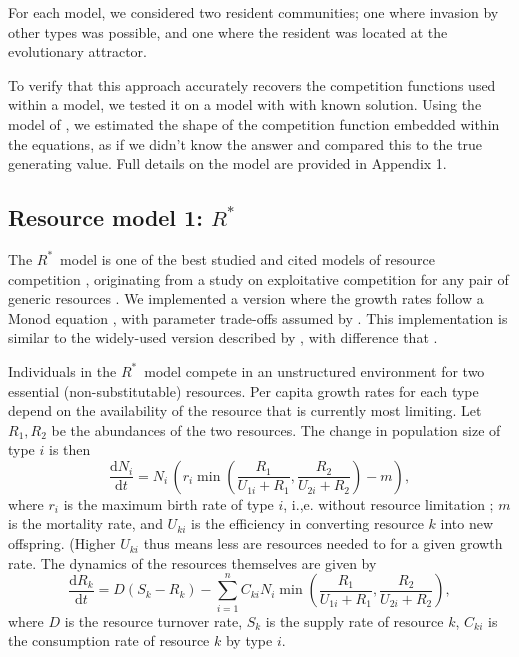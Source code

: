 \documentclass[a4paper,11pt]{article}
\newcommand{\verify}[1]{{\color{navy}{(verify: #1)}}}
\newcommand{\todo}[1]{{\color{navy}{(todo: #1)}}}
\newcommand{\ud}{\ensuremath{\mathrm{d}}}
\newcommand{\Rstar}{\ensuremath{R^*}}
\begin{document}
For each model, we considered two resident communities; one where invasion by other types was possible, and one where the resident was located at the evolutionary attractor.

To verify that this approach accurately recovers the competition functions used within a model, we tested it on a model with with known solution. Using the model of \citet{Dieckmann-1999}, we estimated the shape of the competition function embedded within the equations, as if we didn't know the answer and compared this to the true generating value. Full details on the model are provided in Appendix 1.

\subsection{Resource model 1: \Rstar }

The \Rstar\ model is one of the best studied and cited models of resource competition \citep{Tilman-1977, Tilman-1982, Huisman-2001}, originating from a study on exploitative competition for any pair of generic resources \citep{Leon-1975}. We implemented a version where the growth rates follow a Monod equation \citep{Huisman-2001}, with parameter trade-offs assumed by \citet{Fox-2008}. This implementation is similar to the widely-used version described by \citet{Tilman-1977, Tilman-1982}, with difference that \verify{ (GJK)  What is the difference with Tilman 1977?}. 

\verify{I have shifted the model description from the appendix back into the main text, and tried to make it more streamlined. (GJK)  please review to ensure no meaning has been lost. }

Individuals in the \Rstar\ model compete in an unstructured environment for two essential (non-substitutable) resources. Per capita growth rates for each type depend on the availability of the resource that is currently most limiting. Let $R_1, R_2$ be the abundances of the two resources. The change in population size of type $i$ is then
\begin{equation}
  \label{eq:rstar-n}
  \frac{\ud N_i}{\ud t} = N_i \, \left(r_i \min\left(\frac{R_1}{U_{1i} + R_1}, \frac{R_2}{U_{2i} + R_2}\right) - m\right),
\end{equation}
where $r_i$ is the maximum birth rate of type $i$, i.,e. without resource limitation \verify{(GJK) true?}; $m$ is the mortality rate, and $U_{ki}$ is the efficiency in converting resource $k$ into new offspring. (Higher $U_{ki}$ thus means less are resources needed to for a given growth rate. The dynamics of the resources themselves are given by
\begin{equation}
  \label{eq:rstar-r}
  \frac{\ud R_k}{\ud t} =
  D (S_k - R_k) - \sum_{i=1}^n {C_{ki} N_i
    \min\left(\frac{R_1}{U_{1i} + R_1}, \frac{R_2}{U_{2i} + R_2}\right)},
\end{equation}
where $D$ is the resource turnover rate, $S_k$ is the supply rate of resource $k$, $C_{ki}$ is the consumption rate \verify{ (GJK) consumption rate or resource content?} of resource $k$ by type $i$. 
\todo{(GJK) previous text discussed setting C= U, is this still relevant?} 
\todo{(GJK) previous text said C did not vary among species. Should we mention that here? }
\end{document}
